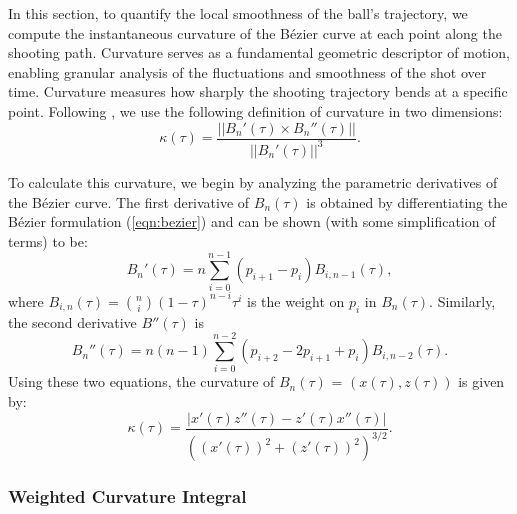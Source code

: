 \documentclass{article}
\begin{document}
          In this section, to quantify the local smoothness of the ball’s trajectory, we compute the instantaneous curvature of the Bézier curve at each point along the shooting path. Curvature serves as a fundamental geometric descriptor of motion, enabling granular analysis of the fluctuations and smoothness of the shot over time. Curvature measures how sharply the shooting trajectory bends at a specific point. Following \citet{slegers_role_2024}, we use the following definition of curvature in two dimensions:
          \[
            \kappa(\tau) = \frac{||B_n'(\tau) \times B_n''(\tau)||}{||B_n'(\tau)||^3}.
          \]
          
          To calculate this curvature, we begin by analyzing the parametric derivatives of the Bézier curve. The first derivative of \(B_n(\tau)\) is obtained by differentiating the Bézier formulation (\ref{eqn:bezier}) and can be shown (with some simplification of terms) to be:
          \[ 
            B_n'(\tau) = n \sum_{i=0}^{n-1} (p_{i+1} - p_i) B_{i,n-1}(\tau),
          \]
          where \(B_{i, n}(\tau) = \binom{n}{i}(1 - \tau)^{n-i}\tau^i\) is the weight on $p_i$ in $B_n(\tau)$. Similarly, the second derivative \( B''(\tau) \) is
          \[
            B_n''(\tau) = n(n-1) \sum_{i=0}^{n-2} (p_{i+2} - 2p_{i+1} + p_i) B_{i,n-2}(\tau).
          \]
          Using these two equations, the curvature of \(B_n(\tau)\) = \((x(\tau), z(\tau))\) is given by:
          \begin{equation}
          \label{eqn:curvature}
            \kappa(\tau) = \frac{\left| x'(\tau) z''(\tau) - z'(\tau) x''(\tau) \right|}{\left( (x'(\tau))^2 + (z'(\tau))^2 \right)^{3/2}}.
          \end{equation}
    
        \subsubsection{Weighted Curvature Integral}
        \label{sec:weighted-curvature-integral}
    
        
\end{document}
